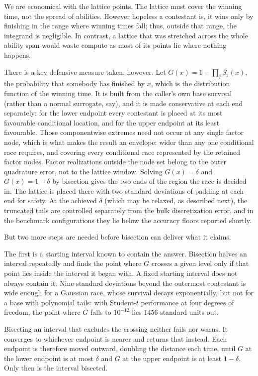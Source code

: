 \documentclass[11pt]{article}
\begin{document}
We are economical with the lattice points. The lattice must cover the winning time, not the spread of abilities. However
hopeless a contestant is, it wins only by finishing in the range where
winning times fall; thus, outside that range, the integrand is negligible. In contrast, a lattice that was stretched across the whole ability span would waste compute as most of its points lie where nothing happens.

There is a key defensive measure taken, however. Let $G(x)=1-\prod_j S_j(x)$, the probability that somebody has finished
by $x$, which is the distribution function of the winning time. It is
built from the caller's own base survival (rather than a normal
surrogate, say), and it is made conservative at each end separately: for
the lower endpoint every contestant is placed at its most favourable
conditional location, and for the upper endpoint at its least favourable.
Those componentwise extremes need not occur at any single factor node,
which is what makes the result an envelope: wider than any one
conditional race requires, and covering every conditional race
represented by the retained factor nodes. Factor realizations outside
the node set belong to the outer quadrature error, not to the lattice
window. Solving $G(x)=\delta$ and
$G(x)=1-\delta$ by bisection gives the two ends of the region the race
is decided in. The lattice is placed there with two standard deviations of padding at
each end for safety. At the achieved $\delta$ (which may be relaxed, as
described next), the truncated tails are controlled separately from the
bulk discretization error, and in the benchmark configurations they lie
below the accuracy floors reported shortly.

But two more steps are needed before bisection can deliver what it claims.

The first is a starting interval known to contain the answer. Bisection
halves an interval repeatedly and finds the point where $G$ crosses a
given level only if that point lies inside the interval it began with. A
fixed starting interval does not always contain it. Nine standard
deviations beyond the outermost contestant is wide enough for a Gaussian
race, whose survival decays exponentially, but not for a base with
polynomial tails: with Student-$t$ performance at four degrees of
freedom, the point where $G$ falls to $10^{-12}$ lies $1456$ standard
units out.

Bisecting an interval that excludes the crossing neither fails nor warns.
It converges to whichever endpoint is nearer and returns that instead.
Each endpoint is therefore moved outward, doubling the distance each
time, until $G$ at the lower endpoint is at most $\delta$ and $G$ at the
upper endpoint is at least $1-\delta$. Only then is the interval
bisected.
\end{document}
